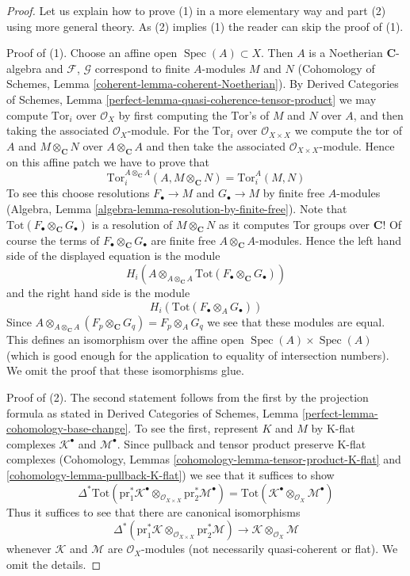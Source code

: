 \documentclass{stacks-project}
\theoremstyle{plain}
\theoremstyle{definition}
\theoremstyle{remark}
\numberwithin{equation}{subsection}
\def\Spec{\mathop{\mathrm{Spec}}}
\begin{document}
\begin{proof}
Let us explain how to prove (1) in a more elementary way and part (2) using
more general theory. As (2) implies (1) the reader can skip the proof
of (1).

\medskip\noindent
Proof of (1). Choose an affine open $\Spec(A) \subset X$.
Then $A$ is a Noetherian $\mathbf{C}$-algebra and
$\mathcal{F}$, $\mathcal{G}$ correspond to finite $A$-modules
$M$ and $N$ (Cohomology of Schemes, Lemma
\ref{coherent-lemma-coherent-Noetherian}).
By Derived Categories of Schemes, Lemma
\ref{perfect-lemma-quasi-coherence-tensor-product} we may
compute $\text{Tor}_i$ over $\mathcal{O}_X$
by first computing the $\text{Tor}$'s
of $M$ and $N$ over $A$, and then taking the associated $\mathcal{O}_X$-module.
For the $\text{Tor}_i$ over $\mathcal{O}_{X \times X}$ we compute
the tor of $A$ and $M \otimes_\mathbf{C} N$ over $A \otimes_\mathbf{C} A$
and then take the associated $\mathcal{O}_{X \times X}$-module.
Hence on this affine patch we have to prove that
$$
\text{Tor}_i^{A \otimes_\mathbf{C} A}(A, M \otimes_\mathbf{C} N) =
\text{Tor}_i^A(M, N)
$$
To see this choose resolutions $F_\bullet \to M$ and $G_\bullet \to M$
by finite free $A$-modules
(Algebra, Lemma \ref{algebra-lemma-resolution-by-finite-free}).
Note that $\text{Tot}(F_\bullet \otimes_\mathbf{C} G_\bullet)$
is a resolution of $M \otimes_\mathbf{C} N$ as it computes
Tor groups over $\mathbf{C}$! Of course the terms of
$F_\bullet \otimes_\mathbf{C} G_\bullet$ are finite free
$A \otimes_\mathbf{C} A$-modules. Hence the left hand side
of the displayed equation is the module
$$
H_i(A \otimes_{A \otimes_\mathbf{C} A}
\text{Tot}(F_\bullet \otimes_\mathbf{C} G_\bullet))
$$
and the right hand side is the module
$$
H_i(\text{Tot}(F_\bullet \otimes_A G_\bullet))
$$
Since $A \otimes_{A \otimes_\mathbf{C} A} (F_p \otimes_\mathbf{C} G_q)
= F_p \otimes_A G_q$ we see that these modules are equal.
This defines an isomorphism over the affine open $\Spec(A) \times \Spec(A)$
(which is good enough for the application to equality of intersection numbers).
We omit the proof that these isomorphisms glue.

\medskip\noindent
Proof of (2). The second statement follows from the first by the
projection formula as stated in
Derived Categories of Schemes, Lemma \ref{perfect-lemma-cohomology-base-change}.
To see the first, represent $K$ and $M$ by K-flat complexes
$\mathcal{K}^\bullet$ and $\mathcal{M}^\bullet$.
Since pullback and tensor product preserve K-flat complexes
(Cohomology, Lemmas \ref{cohomology-lemma-tensor-product-K-flat} and
\ref{cohomology-lemma-pullback-K-flat})
we see that it suffices to show
$$
\Delta^*\text{Tot}(
\text{pr}_1^*\mathcal{K}^\bullet
\otimes_{\mathcal{O}_{X \times X}} \text{pr}_2^*\mathcal{M}^\bullet)
=
\text{Tot}(
\mathcal{K}^\bullet \otimes_{\mathcal{O}_X} \mathcal{M}^\bullet)
$$
Thus it suffices to see that there are canonical isomorphisms
$$
\Delta^*(\text{pr}_1^*\mathcal{K}
\otimes_{\mathcal{O}_{X \times X}} \text{pr}_2^*\mathcal{M})
\longrightarrow
\mathcal{K} \otimes_{\mathcal{O}_X} \mathcal{M}
$$
whenever $\mathcal{K}$ and $\mathcal{M}$ are $\mathcal{O}_X$-modules
(not necessarily quasi-coherent or flat).
We omit the details.
\end{proof}
\end{document}
